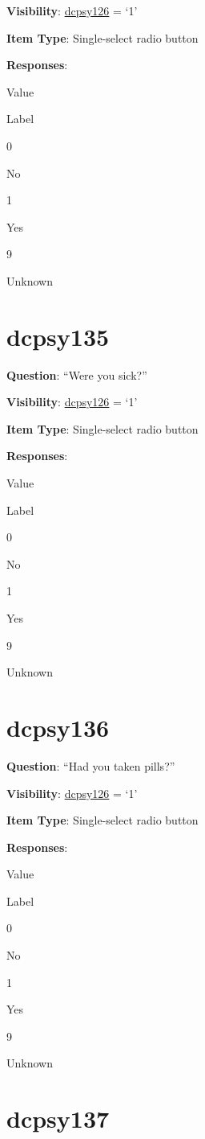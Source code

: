 \documentclass[]{book}
\begin{document}
\textbf{Visibility}: \protect\hyperlink{dcpsy126}{dcpsy126} = `1'

\textbf{Item Type}: Single-select radio button

\textbf{Responses}:

Value

Label

0

No

1

Yes

9

Unknown

\hypertarget{dcpsy135}{%
\section{dcpsy135}\label{dcpsy135}}

\textbf{Question}: ``Were you sick?''

\textbf{Visibility}: \protect\hyperlink{dcpsy126}{dcpsy126} = `1'

\textbf{Item Type}: Single-select radio button

\textbf{Responses}:

Value

Label

0

No

1

Yes

9

Unknown

\hypertarget{dcpsy136}{%
\section{dcpsy136}\label{dcpsy136}}

\textbf{Question}: ``Had you taken pills?''

\textbf{Visibility}: \protect\hyperlink{dcpsy126}{dcpsy126} = `1'

\textbf{Item Type}: Single-select radio button

\textbf{Responses}:

Value

Label

0

No

1

Yes

9

Unknown

\hypertarget{dcpsy137}{%
\section{dcpsy137}\label{dcpsy137}}
\end{document}
